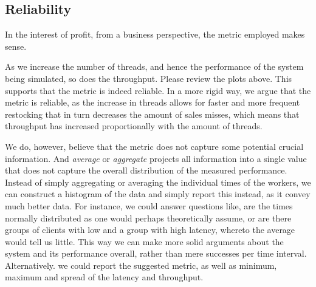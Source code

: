 \subsection{Reliability}
In the interest of profit, from a business perspective, the metric employed
makes sense.

As we increase the number of threads, and hence the performance of the system
being simulated, so does the throughput. Please review the plots above. This
supports that the metric is indeed reliable. In a more rigid way, we argue that
the metric is reliable, as the increase in threads allows for faster and more
frequent restocking that in turn decreases the amount of sales misses, which
means that throughput has increased proportionally with the amount of threads.

We do, however, believe that the metric does not capture some potential
crucial information. And {\it average} or {\it aggregate} projects all
information into a single value that does not capture the overall distribution
of the measured performance. Instead of simply aggregating or averaging the
individual times of the workers, we can construct a histogram of the data and
simply report this instead, as it convey much better data. For instance, we
could answer questions like, are the times normally distributed as one would
perhaps theoretically assume, or are there groups of clients with low and a
group with high latency, whereto the average would tell us little. This way we
can make more solid arguments about the system and its performance overall,
rather than mere successes per time interval. Alternatively. we could report
the suggested metric, as well as minimum, maximum and spread of the latency
and throughput.
